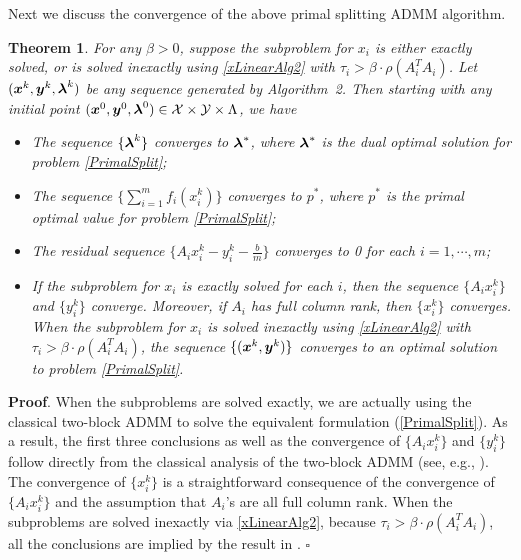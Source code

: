\documentclass{mcom-l}
\newtheorem{theorem}{Theorem}[section]
\theoremstyle{definition}
\theoremstyle{remark}
\numberwithin{equation}{section}
\begin{document}
Next we discuss the convergence of the above primal splitting ADMM algorithm.
\begin{theorem}\label{Algorithm1Convergence}
For any $\beta >0$, suppose the subproblem for $x_i$ is either exactly solved, or is solved inexactly using \eqref{xLinearAlg2} with $\tau_i > \beta \cdot \rho (A_i^T A_i)$. Let
$(\mbox{\boldmath$x$}^k, \mbox{\boldmath$y$}^k, \mbox{\boldmath$\lambda$}^k )$ be any sequence generated by Algorithm~2. Then starting with any initial point $(\mbox{\boldmath$x$}^0, \mbox{\boldmath$y$}^0, \mbox{\boldmath$\lambda$}^0 )\in {\mathcal{X}}\times{\mathcal{Y}}\times\Lambda$, we have
\begin{itemize}
\item[1.] The sequence $\{\mbox{\boldmath$\lambda$}^k\}$ converges to $\mbox{\boldmath$\lambda$}^*$, where $\mbox{\boldmath$\lambda$}^*$ is the dual optimal solution for problem \eqref{PrimalSplit};
\item[2.] The sequence $\{\sum\limits_{i=1}^m f_i (x_i^k)\}$ converges to $p^*$, where $p^*$ is the primal optimal value for problem \eqref{PrimalSplit};
\item[3.] The residual sequence $\{A_i x_i^k - y^k_i-\frac{b}{m}\}$ converges to 0 for each $i=1,\cdots,m$;
\item[4.] If the subproblem for $x_i$ is exactly solved for each $i$, then the sequence $\{A_i x_i^k\}$ and $\{y^k_i\}$ converge. Moreover, if $A_i$ has full column rank, then $\{ x_i^k \}$ converges.  When the subproblem for $x_i$ is solved inexactly using \eqref{xLinearAlg2} with $\tau_i > \beta \cdot \rho (A_i^T A_i)$, the sequence $\{({{\mbox{\boldmath $x$}}}^k,{{\mbox{\boldmath $y$}}}^k)\}$ converges to  an optimal solution to problem
\eqref{PrimalSplit}.
\end{itemize}
\end{theorem}
{\bf{Proof}}. When the subproblems are solved exactly, we are actually using the classical two-block ADMM to solve the equivalent formulation (\ref{PrimalSplit}). As a result, the first three conclusions as well as the convergence of $\{ A_i x_i^k \}$ and $\{y^k_i\}$ follow directly from the classical analysis of the two-block ADMM (see, e.g., \cite[Section 3.2]{BoydADMMsurvey2011}). The convergence of $\{x^k_i\}$ is a straightforward consequence of the convergence of $\{ A_i x_i^k \}$ and the assumption that $A_i$'s are all full column rank. When the subproblems are solved inexactly via \eqref{xLinearAlg2}, because $\tau_i > \beta \cdot \rho (A_i^T A_i)$, all the conclusions are implied by the result in \cite[Theorem 1]{HeLiaoHanYang2002}. \hfill$\square$
\end{document}

